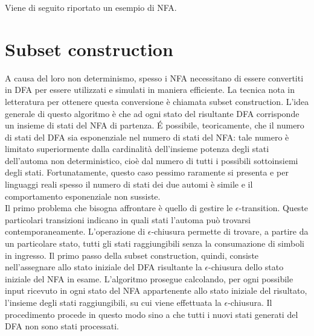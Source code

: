 \begin{ex}
Viene di seguito riportato un esempio di NFA.
\end{ex}

\section{Subset construction}
A causa del loro non determinismo, spesso i NFA necessitano di essere convertiti in DFA per essere utilizzati e simulati in maniera efficiente. La tecnica nota in letteratura per ottenere questa conversione è chiamata subset construction.
L'idea generale di questo algoritmo è che ad ogni stato del risultante DFA corrisponde un insieme di stati del NFA di partenza.
\'E possibile, teoricamente, che il numero di stati del DFA sia esponenziale nel numero di stati del NFA: tale numero è limitato superiormente dalla cardinalità dell'insieme potenza degli stati dell'automa non deterministico, cioè dal numero di tutti i possibili sottoinsiemi degli stati.
Fortunatamente, questo caso pessimo raramente si presenta e per linguaggi reali spesso il numero di stati dei due automi è simile e il comportamento esponenziale non sussiste.\\
Il primo problema che bisogna affrontare è quello di gestire le $\epsilon$-transition. Queste particolari transizioni indicano in quali stati l'automa può trovarsi contemporaneamente. L'operazione di $\epsilon$-chiusura permette di trovare, a partire da un particolare stato, tutti gli stati raggiungibili senza la consumazione di simboli in ingresso. Il primo passo della subset construction, quindi, consiste nell'assegnare allo stato iniziale del DFA risultante la $\epsilon$-chiusura dello stato iniziale del NFA in esame. L'algoritmo prosegue calcolando, per ogni possibile input ricevuto in ogni stato del NFA appartenente allo stato iniziale del risultato, l'insieme degli stati raggiungibili, su cui viene effettuata la $\epsilon$-chiusura. Il procedimento procede in questo modo sino a che tutti i nuovi stati generati del DFA non sono stati processati.

